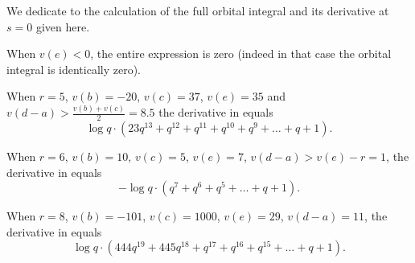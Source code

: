 We dedicate  to the calculation
of the full orbital integral and its derivative at $s = 0$ given here.

\begin{example}
  When $v(e) < 0$, the entire expression is zero
  (indeed in that case the orbital integral is identically zero).
\end{example}

\begin{example}
  When $r=5$, $v(b) = -20$, $v(c) = 37$, $v(e) = 35$ and $v(d-a) > \frac{v(b)+v(c)}{2} = 8.5$
  the derivative in  equals
  \[ \log q \cdot (23q^{13} + q^{12} + q^{11} + q^{10} + q^9 + \dots + q + 1). \]
\end{example}

\begin{example}
  When $r = 6$, $v(b) = 10$, $v(c) = 5$, $v(e) = 7$, $v(d-a) > v(e)-r = 1$,
  the derivative in  equals
  \[ -\log q \cdot (q^7 + q^6 + q^5 + \dots + q + 1). \]
\end{example}

\begin{example}
  When $r = 8$, $v(b) = -101$, $v(c) = 1000$, $v(e) = 29$, $v(d-a) = 11$,
  the derivative in  equals
  \[ \log q \cdot (444 q^{19} + 445q^{18} + q^{17} + q^{16} + q^{15} + \dots + q + 1). \]
\end{example}

